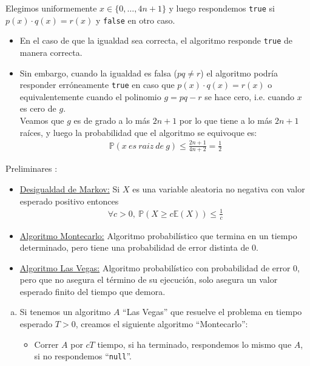 \documentclass[dcc,uchile]{fcfmcourse}
\theoremstyle{plain}
\theoremstyle{definition}
\begin{document}
\begin{problems}
\problem
Elegimos uniformemente $x \in \{0, \ldots, 4n+1\}$ y luego respondemos \texttt{true} si $p(x)\cdot q(x) = r(x)$ y \texttt{false} en otro caso. 
\begin{itemize}
    \item En el caso de que la igualdad sea correcta, el algoritmo responde \texttt{true} de manera correcta.
    \item Sin embargo, cuando la igualdad es falsa ($pq\not =r$) el algoritmo podría responder erróneamente \texttt{true} en caso que $p(x)\cdot q(x) = r(x)$ o equivalentemente cuando el polinomio $g = pq - r$ se hace cero, i.e. cuando $x$ es cero de $g$.\\
    Veamos que $g$ es de grado a lo más $2n+1$ por lo que tiene a lo más $2n+1$ raíces, y luego la probabilidad que el algoritmo se equivoque es:
    \begin{align*}
        \mathbb{P}(x\ es\ raiz\ de\ g) \le \frac{2n+1}{4n+2} = \frac{1}{2}
    \end{align*}
\end{itemize}
\problem 
Preliminares :
\begin{itemize}
    \item \underline{Desigualdad de Markov:} Si $X$ es una variable aleatoria no negativa con valor esperado positivo entonces
    \begin{align*}
        \forall c > 0,\ \mathbb{P}(X \ge c \mathbb{E}(X)) \le \frac{1}{c}
    \end{align*}
    \item \underline{Algoritmo Montecarlo:} Algoritmo probabilístico que termina en un tiempo determinado, pero tiene una probabilidad de error distinta de $0$.
    \item \underline{Algoritmo Las Vegas:} Algoritmo probabilístico con probabilidad de error $0$, pero que no asegura el término de su ejecución, solo asegura un valor esperado finito del tiempo que demora.
\end{itemize}
\begin{enumerate}[a)]
\item Si tenemos un algoritmo $A$ ``Las Vegas'' que resuelve el problema en tiempo esperado $T > 0$, creamos el siguiente algoritmo ``Montecarlo'':
\begin{itemize}
    \item Correr $A$ por $cT$ tiempo, si ha terminado, respondemos lo mismo que $A$, si no respondemos ``\texttt{null}''.
\end{itemize}

\end{enumerate}
\end{problems}
\end{document}
